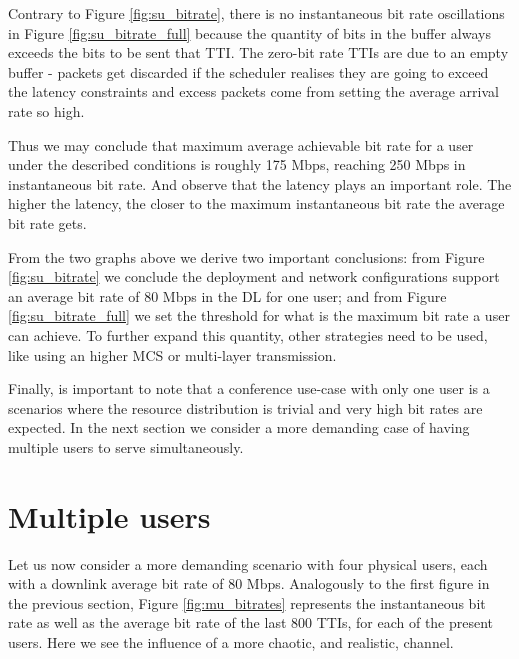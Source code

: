 
Contrary to Figure \ref{fig:su_bitrate}, there is no instantaneous bit rate oscillations in Figure \ref{fig:su_bitrate_full} because the quantity of bits in the buffer always exceeds the bits to be sent that TTI. The zero-bit rate TTIs are due to an empty buffer - packets get discarded if the scheduler realises they are going to exceed the latency constraints and excess packets come from setting the average arrival rate so high.

Thus we may conclude that maximum average achievable bit rate for a user under the described conditions is roughly 175 Mbps, reaching 250 Mbps in instantaneous bit rate. And observe that the latency plays an important role. The higher the latency, the closer to the maximum instantaneous bit rate the average bit rate gets. 

From the two graphs above we derive two important conclusions: from Figure \ref{fig:su_bitrate} we conclude the deployment and network configurations support an average bit rate of 80 Mbps in the \ac{DL} for one user; and from Figure \ref{fig:su_bitrate_full} we set the threshold for what is the maximum bit rate a user can achieve. To further expand this quantity, other strategies need to be used, like using an higher MCS or multi-layer transmission.

Finally, is important to note that a conference use-case with only one user is a scenarios where the resource distribution is trivial and very high bit rates are expected. In the next section we consider a more demanding case of having multiple users to serve simultaneously.



\section{Multiple users} \label{sec:multi-user}

Let us now consider a more demanding scenario with four physical users, each with a downlink average bit rate of 80 Mbps. Analogously to the first figure in the previous section, Figure \ref{fig:mu_bitrates} represents the instantaneous bit rate as well as the average bit rate of the last 800 TTIs, for each of the present users. Here we see the influence of a more chaotic, and realistic, channel.


